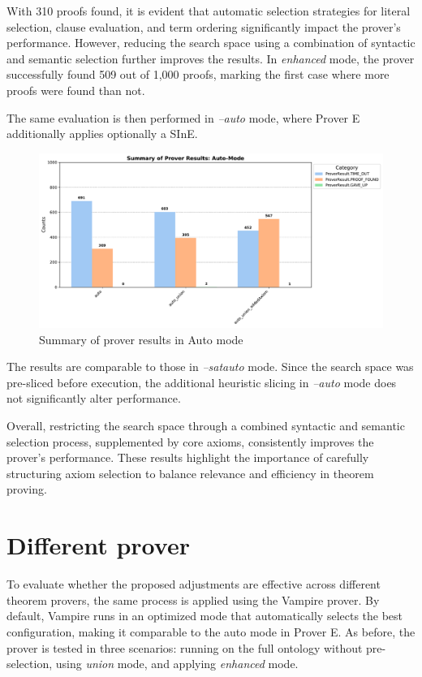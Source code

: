 \documentclass[english,version-2020-11]{uzl-thesis}
\begin{document}
With 310 proofs found, it is evident that automatic selection strategies for literal selection, clause evaluation, and term ordering significantly impact the prover's performance. However, reducing the search space using a combination of syntactic and semantic selection further improves the results. In \textit{enhanced} mode, the prover successfully found 509 out of 1,000 proofs, marking the first case where more proofs were found than not.

The same evaluation is then performed in \textit{--auto} mode, where Prover E additionally applies optionally a SInE.

\begin{figure}[h!]
    \centering
    \includegraphics[width=\textwidth]{auto_mode_output.pdf}
    \caption{Summary of prover results in Auto mode}
    \label{fig:prover_results_auto}
\end{figure}
\FloatBarrier

The results are comparable to those in \textit{--satauto} mode. Since the search space was pre-sliced before execution, the additional heuristic slicing in \textit{--auto} mode does not significantly alter performance.

Overall, restricting the search space through a combined syntactic and semantic selection process, supplemented by core axioms, consistently improves the prover’s performance. These results highlight the importance of carefully structuring axiom selection to balance relevance and efficiency in theorem proving.

\section{Different prover}
To evaluate whether the proposed adjustments are effective across different theorem provers, the same process is applied using the Vampire prover. By default, Vampire runs in an optimized mode that automatically selects the best configuration, making it comparable to the auto mode in Prover E. As before, the prover is tested in three scenarios: running on the full ontology without pre-selection, using \textit{union} mode, and applying \textit{enhanced} mode.
\end{document}
